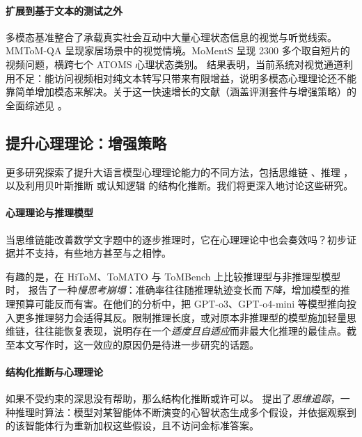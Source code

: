 \paragraph{扩展到基于文本的测试之外}
多模态基准整合了承载真实社会互动中大量心理状态信息的视觉与听觉线索。MMToM-QA \cite{jin2024mmtomqamultimodaltheorymind} 呈现家居场景中的视觉情境。MoMentS \citep{villa2025moments} 呈现 2300 多个取自短片的视频问题，横跨七个 ATOMS 心理状态类别。
结果表明，当前系统对视觉通道利用不足：能访问视频相对纯文本转写只带来有限增益，说明多模态心理理论还不能靠简单增加模态来解决。关于这一快速增长的文献（涵盖评测套件与增强策略）的全面综述见 \citet{chen-etal-2025-theory}。

\subsection{提升心理理论：增强策略} \label{sec:enhancement}
更多研究探索了提升大语言模型心理理论能力的不同方法，包括思维链 \citep{moghaddam2023boostingtheoryofmindperformancelarge}、推理 \citep{kim2025hypothesis}，以及利用贝叶斯推断 \citep{jin2024mmtomqamultimodaltheorymind} 或认知逻辑 \citep{wuDELToMInferenceTimeScaling2025a} 的结构化推断。我们将更深入地讨论这些研究。

\paragraph{心理理论与推理模型} \label{sec:tomreasoning}
当思维链能改善数学文字题中的逐步推理时，它在心理理论中也会奏效吗？初步证据并不支持，有些地方甚至与之相悖。

有趣的是，在 HiToM、ToMATO 与 ToMBench 上比较推理型与非推理型模型时，\citet{gong2026think} 报告了一种{\em 慢思考崩塌}：准确率往往随推理轨迹变长而\emph{下降}，增加模型的推理预算可能反而有害。在他们的分析中，把 GPT-o3、GPT-o4-mini 等模型推向投入更多推理努力会适得其反。限制推理长度，或对原本非推理型的模型施加轻量思维链，往往能恢复表现，说明存在一个\emph{适度且自适应}而非最大化推理的最佳点。截至本文写作时，这一效应的原因仍是待进一步研究的话题。

\paragraph{结构化推断与心理理论} 
如果不受约束的深思没有帮助，那么结构化推断或许可以。\citet{kim2025hypothesis} 提出了\emph{思维追踪}，一种推理时算法：模型对某智能体不断演变的心智状态生成多个假设，并依据观察到的该智能体行为重新加权这些假设，且不访问金标准答案。

